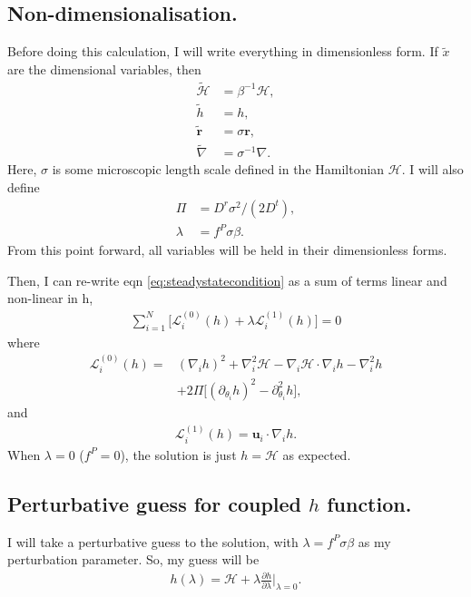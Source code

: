 \documentclass[twocolumn,amsmath,amssymb,aps]{revtex4-1}%
\begin{document}
\subsection{Non-dimensionalisation.}

Before doing this calculation, I will write everything in dimensionless form.
If $\tilde{x}$ are the dimensional variables, then
\begin{align}
  \tilde{\mathcal{H}} &= \beta^{-1}\mathcal{H},\\
  \tilde{h} &= h,\\
  \tilde{\bm{r}} &= \sigma\bm{r},\\
  \tilde{\nabla} &= \sigma^{-1}\nabla.
\end{align}
Here, $\sigma$ is some microscopic length scale defined in the Hamiltonian
$\mathcal{H}$. I will also define
\begin{align}
  \Pi &= D^r\sigma^2/(2D^t),\\
  \lambda &= f^P\sigma\beta.
\end{align}
From this point forward, all variables will be held in their dimensionless
forms.


Then, I can re-write eqn \ref{eq:steadystatecondition} as a sum of terms
linear and non-linear in $\mathrm{h}$,
\begin{align}\label{eq:dim_ss}
  \sum_{i=1}^N\big[\mathcal{L}_i^{(0)}(h)
    +\lambda\mathcal{L}_i^{(1)}(h)\big] = 0
\end{align}
where
\begin{align}
  \mathcal{L}_i^{(0)}(h)=&(\nabla_i h)^2 + \nabla_i^2\mathcal{H}
  -\nabla_i\mathcal{H}\cdot\nabla_ih-\nabla_i^2h\nonumber\\
  &+2\Pi\big[(\partial_{\theta_i}h)^2-\partial_{\theta_i}^2h\big],
\end{align}
and
\begin{align}
  \mathcal{L}_i^{(1)}(h)=\bm{u}_i\cdot\nabla_ih.
\end{align}
When $\lambda = 0$ ($f^P=0$), the solution is just $h=\mathcal{H}$ as expected.

\subsection{Perturbative guess for coupled $h$ function.}

I will take a perturbative guess to the solution, with $\lambda=f^P\sigma\beta$
as my perturbation parameter. So, my guess will be
\begin{align}\label{eq:hperturb}
  h(\lambda) = \mathcal{H}
  + \lambda\frac{\partial h}{\partial \lambda}\bigg|_{\lambda=0}.
\end{align}
\end{document}

